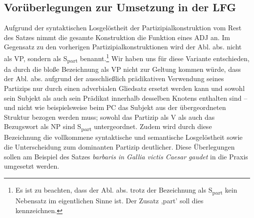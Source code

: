 \documentclass[12pt,a4paper]{article}
\begin{document}
\subsection{Vorüberlegungen zur Umsetzung in der LFG}
Aufgrund der syntaktischen Losgelöstheit der Partizipialkonstruktion vom Rest des Satzes nimmt die gesamte Konstruktion die Funktion eines ADJ an. Im Gegensatz zu den vorherigen Partizipialkonstruktionen wird der Abl. abs. nicht als VP, sondern als S\textsubscript{part} benannt.\footnote{Es ist zu beachten, dass der Abl. abs. trotz der Bezeichnung als S\textsubscript{part} kein Nebensatz im eigentlichen Sinne ist. Der Zusatz ,part' soll dies kennzeichnen.}
Wir haben uns für diese Variante entschieden, da durch die bloße Bezeichnung als VP nicht zur Geltung kommen würde, dass der Abl. abs. aufgrund der ausschließlich prädikativen Verwendung seines Partizips nur durch einen adverbialen Gliedsatz ersetzt werden kann und sowohl sein Subjekt als auch sein Prädikat innerhalb desselben Knotens enthalten sind -- und nicht wie beispielsweise beim PC das Subjekt aus der übergeordneten Struktur bezogen werden muss; sowohl das Partizip als V als auch das Bezugswort als NP sind S\textsubscript{part} untergeordnet. Zudem wird durch diese Bezeichnung die vollkommene syntaktische und semantische Losgelöstheit sowie die Unterscheidung zum dominanten Partizip deutlicher.
Diese Überlegungen sollen am Beispiel des Satzes \textit{barbaris in Gallia victis Caesar gaudet} in die Praxis umgesetzt werden.

\end{document}
